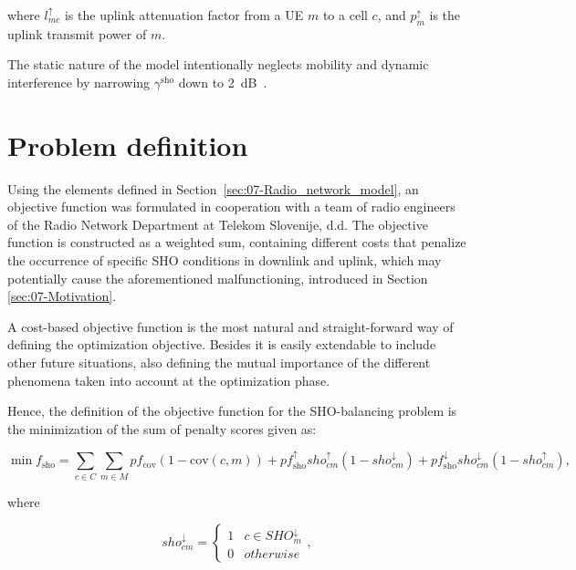 \noindent where $l_{mc}^{\uparrow}$ is the uplink attenuation factor
from a UE $m$ to a cell $c$, and $p_{m}^{\uparrow}$
is the uplink transmit power of $m$.

The static nature of the model intentionally neglects mobility and
dynamic interference by narrowing $\gamma^{\mathrm{sho}}$ down to
2~dB~\cite{Nawrocki-Understanding_UMTS_radio_network_modelling_and_optimisation:2006}.


\section{Problem definition \label{sec:07-Problem_definition}}

Using the elements defined in Section~\ref{sec:07-Radio_network_model},
an objective function was formulated in cooperation with a team of
radio engineers of the Radio Network Department at Telekom Slovenije,
d.d. The objective function is constructed as a weighted sum, containing
different costs that penalize the occurrence of specific SHO conditions
in downlink and uplink, which may potentially cause the aforementioned
malfunctioning, introduced in Section \ref{sec:07-Motivation}.

A cost-based objective function is the most natural and straight-forward
way of defining the optimization objective. Besides it is easily extendable
to include other future situations, also defining the mutual importance
of the different phenomena taken into account at the optimization
phase.

Hence, the definition of the objective function for the SHO-balancing
problem is the minimization of the sum of penalty scores given as:

\begin{equation}
\min f_{\mathrm{sho}}=\sum_{c\in C}\sum_{m\in M}pf_{\mathrm{cov}}(1-\mathrm{cov}(c,m))+pf_{\mathrm{sho}}^{\uparrow}sho_{cm}^{\uparrow}(1-sho_{cm}^{\downarrow})+pf_{\mathrm{sho}}^{\downarrow}sho_{cm}^{\downarrow}(1-sho_{cm}^{\uparrow}),\label{eq:07-objective_function}
\end{equation}



\noindent where 

\begin{equation}
sho_{cm}^{\downarrow}=\begin{cases}
1 & c\in SHO_{m}^{\downarrow}\\
0 & otherwise
\end{cases},
\end{equation}


